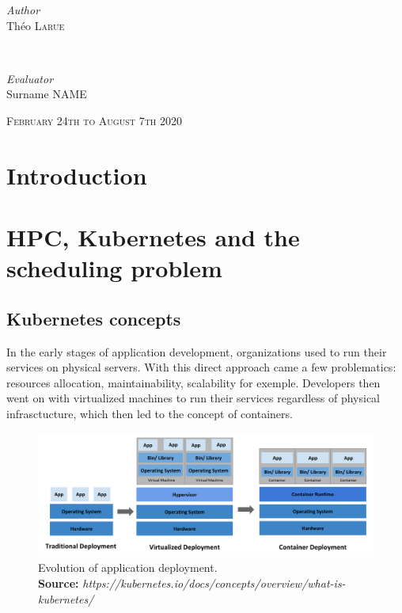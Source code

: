 \documentclass[12pt]{report}
\newcommand*{\captionsource}[2]{%
    \caption[{#1}]{%
        #1%
        \\\hspace{\linewidth}%
	\textbf{Source:} \textit{#2}%
    }%
}
\begin{document}
\begin{titlepage}
    \begin{minipage}{0.4\textwidth}
        \begin{flushleft}
            \large
	    \textit{Author}\\
            Théo \textsc{Larue}
        \end{flushleft}
    \end{minipage}
    ~
    \begin{minipage}{0.4\textwidth}
        \begin{flushright}
            \large
	    \textit{Evaluator}\\
	    Surname \textsc{NAME}
        \end{flushright}
    \end{minipage}

    \vspace{2cm}

    \vspace{2cm}
    \vfill
    \textsc{\large February 24th to August 7th 2020}\\[0.5cm]


\end{titlepage}

\tableofcontents
\newpage

\chapter{Introduction}


\chapter{HPC, Kubernetes and the scheduling problem}

\section{Kubernetes concepts}

In the early stages of application development, organizations used to run their
services on physical servers. With this direct approach came a few
problematics: resources allocation, maintainability, scalability for exemple.
Developers then went on with virtualized machines to run their services
regardless of physical infrasctucture, which then led to the concept of
containers.

\begin{figure}[h]
	\centering
	\includegraphics[width=\textwidth]{../imgs/container_evolution.png}
	\captionsource{Evolution of application deployment.}{https://kubernetes.io/docs/concepts/overview/what-is-kubernetes/}
	\label{fig:container-evolution}
\end{figure}
\end{document}
